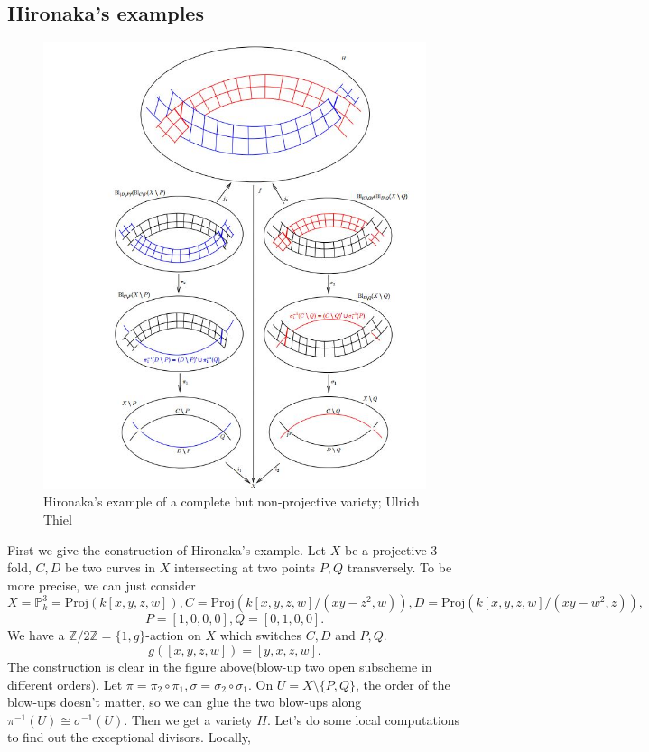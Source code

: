 \documentclass[../main.tex]{subfiles}
\begin{document}
\subsection{Hironaka's examples}
\begin{example}
\begin{figure}[h!]
\centering
\includegraphics[width=\textwidth]{img/hironaka.JPG}
\caption{Hironaka’s example of a complete but non-projective variety; Ulrich Thiel}
\label{fig:Hironaka’s example}
\end{figure}
First we give the  construction of Hironaka's example. Let $X$ be a projective $3$-fold,  $C,D$ be two curves in $X$ intersecting at two points $P,Q$ transversely. To be more precise, we can just consider  
$$X=\mathbb{P}_{k}^{3}=\mathrm{Proj}(k[x,y,z,w]),C=\mathrm{Proj}(k[x,y,z,w]/(xy-z^{2},w)),D=\mathrm{Proj}(k[x,y,z,w]/(xy-w^{2},z)),$$
$$P=[1,0,0,0], Q=[0,1,0,0].$$
We have a $\mathbb{Z}/2\mathbb{Z}=\{1,g\}$-action on $X$ which switches $C,D$ and $P,Q$.   
$$g([x,y,z,w])=[y,x,z,w].$$
The construction is clear in the figure above(blow-up two open subscheme in different orders).  Let $\pi=\pi_{2}\circ \pi_{1} , \sigma=\sigma_{2}\circ \sigma_{1}$. On $U=X\setminus\{P,Q\}$, the order of the blow-ups doesn't matter, so we can glue the two blow-ups along $\pi^{-1}(U)\cong \sigma^{-1}(U)$. Then we get a variety $H$. Let's do some local computations to find out the exceptional divisors. Locally, 

\end{example}
\end{document}
